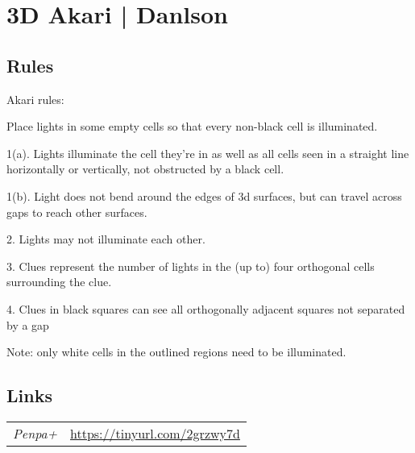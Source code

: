 \section{3D Akari | {\normalfont Danlson}}
\label{sec:17-3d-akari-danlson}

\subsection*{Rules}
\begin{markdown}
Akari rules:

Place lights in some empty cells so that every non-black cell is illuminated.

1(a). Lights illuminate the cell they’re in as well as all cells seen in a straight line horizontally or vertically, not obstructed by a black cell.

1(b). Light does not bend around the edges of 3d surfaces, but can travel across gaps to reach other surfaces.

2. Lights may not illuminate each other.

3. Clues represent the number of lights in the (up to) four orthogonal cells surrounding the clue.

4. Clues in black squares can see all orthogonally adjacent squares not separated by a gap



Note:  only white cells in the outlined regions need to be illuminated.
\end{markdown}
\subsection*{Links}
\begin{tabularx}{\textwidth}{l X}
\emph{Penpa+} & \url{https://tinyurl.com/2grzwy7d} \\
\end{tabularx}
\pagebreak
